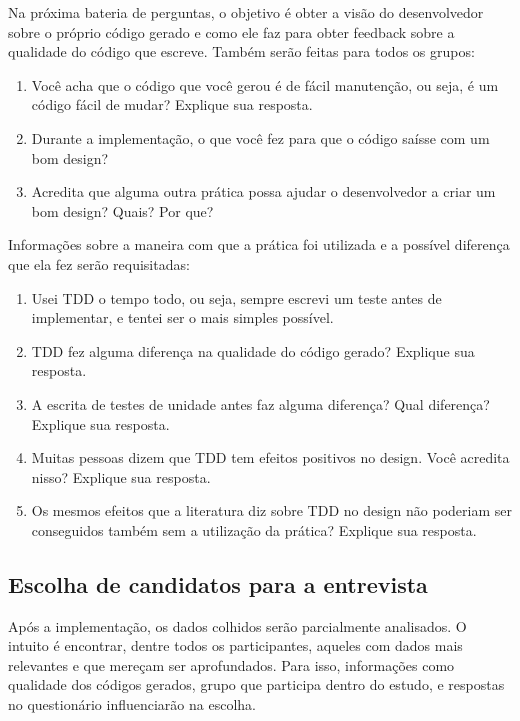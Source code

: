 Na próxima bateria de perguntas, o objetivo é obter a visão do desenvolvedor sobre o próprio código gerado e como ele
faz para obter feedback sobre a qualidade do código que escreve. Também serão feitas para todos os grupos:

\begin{enumerate}
	\item Você acha que o código que você gerou é de fácil manutenção, ou seja, é um código fácil de mudar? Explique sua resposta.
	\item Durante a implementação, o que você fez para que o código saísse com um bom design?
	\item Acredita que alguma outra prática possa ajudar o desenvolvedor a criar um bom design? Quais? Por que?
\end{enumerate}

Informações sobre a maneira com que a prática foi utilizada e a possível
diferença que ela fez serão requisitadas:

\begin{enumerate}
	\item Usei TDD o tempo todo, ou seja, sempre escrevi um teste antes de implementar, e tentei ser o mais simples possível.
	\item TDD fez alguma diferença na qualidade do código gerado? Explique sua resposta.
	\item A escrita de testes de unidade antes faz alguma diferença? Qual diferença? Explique sua resposta.
	\item Muitas pessoas dizem que TDD tem efeitos positivos no design. Você acredita nisso? Explique sua resposta.
	\item Os mesmos efeitos que a literatura diz sobre TDD no design não poderiam ser conseguidos também sem a utilização da prática? Explique sua resposta.
\end{enumerate}

\subsection{Escolha de candidatos para a entrevista}

Após a implementação, os dados colhidos serão parcialmente analisados. O intuito
é encontrar, dentre todos os participantes, aqueles com dados mais relevantes
e que mereçam ser aprofundados.
Para isso, informações como qualidade dos códigos gerados, grupo que participa
dentro do estudo, e respostas no questionário influenciarão na escolha.


